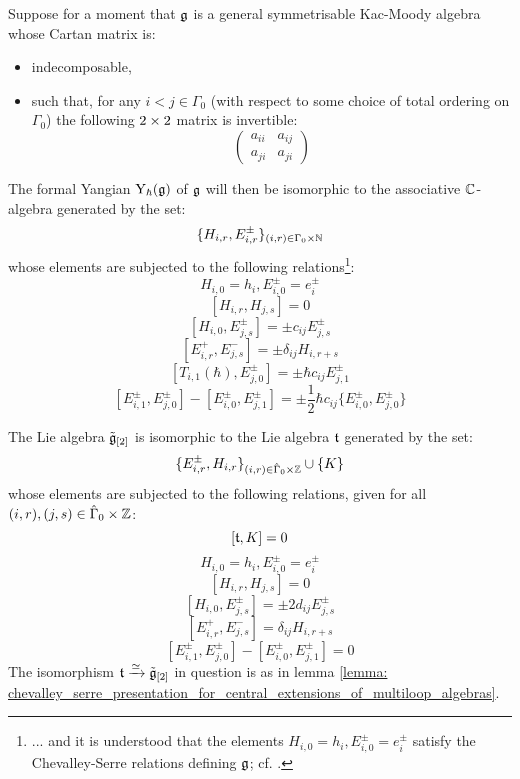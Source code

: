        \begin{lemma} \label{lemma: levendorskii_presentation}
            \cite[Theorem 2.13]{guay_nakajima_wendlandt_affine_yangian_coproduct} Suppose for a moment that $\mathfrak{g}$ is a general symmetrisable Kac-Moody algebra whose Cartan matrix is:
            \begin{itemize}
                \item indecomposable,
                \item such that, for any $i < j \in \Gamma_0$ (with respect to some choice of total ordering on $\Gamma_0$) the following $2 \x 2$ matrix is invertible:
                    $$
                        \begin{pmatrix}
                            a_{ii} & a_{ij}
                            \\
                            a_{ji} & a_{ji}
                        \end{pmatrix}
                    $$
            \end{itemize}
            The formal Yangian $\mathrm{Y}_{\hbar}(\mathfrak{g})$ of $\mathfrak{g}$ will then be isomorphic to the associative $\mathbb{C}$-algebra generated by the set:
                $$\{ H_{i, r}, E_{i, r}^{\pm} \}_{(i, r) \in \Gamma_0 \x \N}$$
            whose elements are subjected to the following relations\footnote{... and it is understood that the elements $H_{i, 0} = h_i, E_{i, 0}^{\pm} = e_i^{\pm}$ satisfy the Chevalley-Serre relations defining $\mathfrak{g}$; cf. \cite[Chapter 1]{kac_infinite_dimensional_lie_algebras}.}:
                $$H_{i, 0} = h_i, E_{i, 0}^{\pm} = e_i^{\pm}$$
                $$[ H_{i, r}, H_{j, s} ] = 0$$
                $$[ H_{i, 0}, E_{j, s}^{\pm} ] = \pm c_{ij} E_{j, s}^{\pm}$$
                $$[ E_{i, r}^+, E_{j, s}^- ] = \pm \delta_{ij} H_{i, r + s}$$
                $$\left[ T_{i, 1}(\hbar), E_{j, 0}^{\pm} \right] = \pm \hbar c_{ij} E_{j, 1}^{\pm}$$
                $$[ E_{i, 1}^{\pm}, E_{j, 0}^{\pm} ] - [ E_{i, 0}^{\pm}, E_{j, 1}^{\pm} ] = \pm \frac12 \hbar c_{ij} \{E_{i, 0}^{\pm}, E_{j, 0}^{\pm}\}$$
        \end{lemma}
        \begin{proposition} \label{prop: levendorskii_presentation__for_central_extensions_of_multiloop_algebras}
            The Lie algebra $\tilde{\mathfrak{g}}_{[2]}$ is isomorphic to the Lie algebra $\mathfrak{t}$ generated by the set:
                $$\{ E_{i, r}^{\pm}, H_{i, r} \}_{(i, r) \in \hat{\Gamma}_0 \x \Z} \cup \{ K \}$$
            whose elements are subjected to the following relations, given for all $(i, r), (j, s) \in \hat{\Gamma}_0 \x \Z$:
                $$[\mathfrak{t}, K] = 0$$
                $$H_{i, 0} = h_i, E_{i, 0}^{\pm} = e_i^{\pm}$$
                $$[ H_{i, r}, H_{j, s} ] = 0$$
                $$[ H_{i, 0}, E_{j, s}^{\pm} ] = \pm 2 d_{ij} E_{j, s}^{\pm}$$
                $$[ E_{i, r}^+, E_{j, s}^- ] = \delta_{ij} H_{i, r + s}$$
                $$[ E_{i, 1}^{\pm}, E_{j, 0}^{\pm} ] - [ E_{i, 0}^{\pm}, E_{j, 1}^{\pm} ] = 0$$
            The isomorphism $\mathfrak{t} \xrightarrow[]{\simeq} \tilde{\mathfrak{g}}_{[2]}$ in question is as in lemma \ref{lemma: chevalley_serre_presentation_for_central_extensions_of_multiloop_algebras}.
        \end{proposition}
